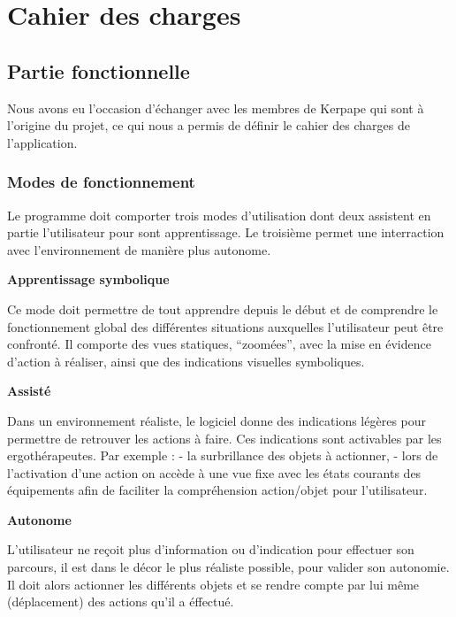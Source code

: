 
\section{Cahier des charges}
\subsection{Partie fonctionnelle}

Nous avons eu l’occasion d’échanger avec les membres de Kerpape qui sont à l’origine du projet, ce qui nous a permis de définir le cahier des charges de l’application.

\subsubsection{Modes de fonctionnement}

Le programme doit comporter trois modes d’utilisation dont deux assistent en partie l’utilisateur pour sont apprentissage. Le troisième permet une interraction avec l'environnement de manière plus autonome.
\newline 

\textbf{Apprentissage symbolique}
\newline 

Ce mode doit permettre de tout apprendre depuis le début et de comprendre le fonctionnement global des différentes situations auxquelles l'utilisateur peut être confronté. Il comporte des vues statiques, “zoomées”, avec la mise en évidence d’action à réaliser, ainsi que des indications visuelles symboliques.
\newline 

\textbf{Assisté}
\newline 

Dans un environnement réaliste, le logiciel donne des indications légères pour permettre de retrouver les actions à faire. Ces indications sont activables par les ergothérapeutes. \newline 
Par exemple :\newline 
- la surbrillance des objets à actionner,\newline 
- lors de l'activation d'une action on accède à une vue fixe avec les états courants des équipements afin de faciliter la compréhension action/objet pour l'utilisateur.
\newline 

\textbf{Autonome}
\newline 

L’utilisateur ne reçoit plus d’information ou d’indication pour effectuer son parcours, il est dans le décor le plus réaliste possible, pour valider son autonomie. Il doit alors actionner les différents objets et se rendre compte par lui même (déplacement) des actions qu'il a éffectué.

